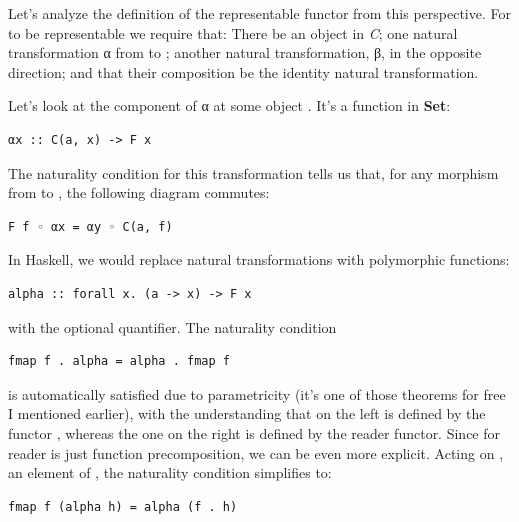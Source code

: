 Let's analyze the definition of the representable functor from this
perspective. For  to be representable we require that: There
be an object  in \emph{C}; one natural transformation α from
 to ; another natural transformation, β, in
the opposite direction; and that their composition be the identity
natural transformation.

Let's look at the component of α at some object . It's a
function in \textbf{Set}:

\begin{Verbatim}[commandchars=\\\{\}]
αx :: C(a, x) -> F x
\end{Verbatim}

The naturality condition for this transformation tells us that, for any
morphism  from  to , the following diagram
commutes:

\begin{Verbatim}[commandchars=\\\{\}]
F f ◦ αx = αy ◦ C(a, f)
\end{Verbatim}

In Haskell, we would replace natural transformations with polymorphic
functions:

\begin{Verbatim}[commandchars=\\\{\}]
alpha :: forall x. (a -> x) -> F x
\end{Verbatim}

with the optional  quantifier. The naturality condition

\begin{Verbatim}[commandchars=\\\{\}]
fmap f . alpha = alpha . fmap f
\end{Verbatim}

is automatically satisfied due to parametricity (it's one of those
theorems for free I mentioned earlier), with the understanding that
 on the left is defined by the functor , whereas
the one on the right is defined by the reader functor. Since
 for reader is just function precomposition, we can be even
more explicit. Acting on , an element of ,
the naturality condition simplifies to:

\begin{Verbatim}[commandchars=\\\{\}]
fmap f (alpha h) = alpha (f . h)
\end{Verbatim}

